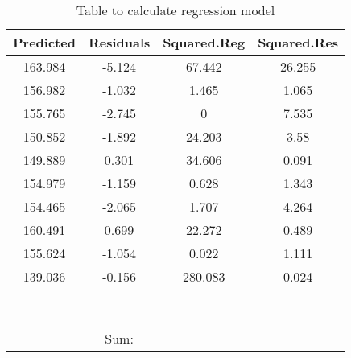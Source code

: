 \documentclass[11pt]{exam}
\begin{document}
\begin{table}[ht]
\begin{center}
\begin{tabular}{|c|c|c|c|}
  \hline
Predicted & Residuals & Squared.Reg & Squared.Res \\ 
  \hline
163.984 & -5.124 & 67.442 & 26.255 \\ 
   \hline
156.982 & -1.032 & 1.465 & 1.065 \\ 
   \hline
155.765 & -2.745 & 0 & 7.535 \\ 
   \hline
150.852 & -1.892 & 24.203 & 3.58 \\ 
   \hline
149.889 & 0.301 & 34.606 & 0.091 \\ 
   \hline
154.979 & -1.159 & 0.628 & 1.343 \\ 
   \hline
154.465 & -2.065 & 1.707 & 4.264 \\ 
   \hline
160.491 & 0.699 & 22.272 & 0.489 \\ 
   \hline
155.624 & -1.054 & 0.022 & 1.111 \\ 
   \hline
139.036 & -0.156 & 280.083 & 0.024 \\ 
   \hline
 &  &  &  \\ 
   \hline
 &  &  &  \\ 
   \hline
 &  &  &  \\ 
   \hline
 &  &  &  \\ 
   \hline
 &  &  &  \\ 
   \hline
 &  &  &  \\ 
   \hline
 &  &  &  \\ 
   \hline
 &  &  &  \\ 
   \hline
\hline
 & Sum: &  &  \\ 
   \hline
\end{tabular}
\caption{Table to calculate regression model}
\label{tab:401k-reg}
\end{center}
\end{table}\fi
\end{document}
